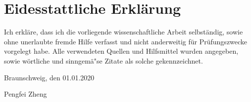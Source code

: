\chapter*{Eidesstattliche Erkl\"{a}rung}

\noindent Ich erkl\"{a}re, dass ich die vorliegende wissenschaftliche Arbeit selbst\"{a}ndig, sowie ohne unerlaubte fremde Hilfe verfasst und nicht anderweitig f\"{u}r Pr\"{u}fungszwecke vorgelegt habe. Alle verwendeten Quellen und Hilfsmittel wurden angegeben, sowie w\"{o}rtliche und sinngem\"{a}"se Zitate als solche gekennzeichnet.

\vskip 0.75cm
\noindent Braunschweig, den 01.01.2020

\vskip 0.75cm
\noindent Pengfei Zheng